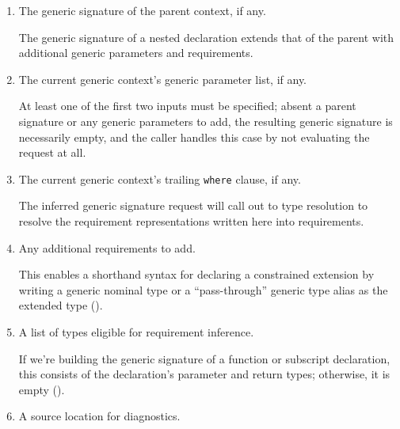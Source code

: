 \documentclass[../generics]{subfiles}
\begin{document}
\begin{enumerate}
\item The generic signature of the parent context, if any.

The generic signature of a nested declaration extends that of the parent with additional generic parameters and requirements.

\item The current generic context's generic parameter list, if any.

At least one of the first two inputs must be specified; absent a parent signature or any generic parameters to add, the resulting generic signature is necessarily empty, and the caller handles this case by not evaluating the request at all.

\item The current generic context's trailing \texttt{where} clause, if any.

The inferred generic signature request will call out to type resolution to resolve the requirement representations written here into requirements.

\item Any additional requirements to add.

This enables a shorthand syntax for declaring a constrained extension by writing a generic nominal type or a ``pass-through'' generic type alias as the extended type ().

\item A list of types eligible for requirement inference.

If we're building the generic signature of a function or subscript declaration, this consists of the declaration's parameter and return types; otherwise, it is empty ().

\item A source location for diagnostics.
\end{enumerate}
\end{document}
